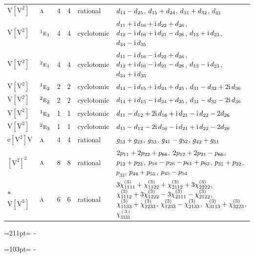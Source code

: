 \documentclass[10pt,a4paper]{article}
\newcommand{\needspace}[1]{\par\penalty-100\begingroup\dimen0=#1\relax\dimen2=\pagegoal
  \advance\dimen2-\pagetotal\ifdim\dimen0>\dimen2\relax\ifdim\dimen2>0pt\vfil\break\fi\fi
  \endgroup}
\numberwithin{equation}{section}
\newcommand{\irr}[1]{\text{\normalfont\scshape #1}}
\newcommand{\conjpair}[1]{{}^{#1}}
\newcommand{\iunit}{\mathrm{i}}
\newcommand{\jahn}[1]{\mathrm{#1}}
\newlength{\fillwidth}\newlength{\cellwidth}\newlength{\colwidth}
\newcommand{\signbreak}{\penalty100\relax}
\begin{document}
{\begin{longtable}{@{}llrrl>{\RaggedRight\arraybackslash}p{\fillwidth}@{}}
$\jahn{V[V^{2}]}$ & $\irr{a}$ & 4 & 4 & rational & $d_{14} -\signbreak d_{25}$, $d_{15} +\signbreak d_{24}$, $d_{31} +\signbreak d_{32}$, $d_{33}$\\
$\jahn{V[V^{2}]}$ & $\conjpair{1}\irr{e}_{1}$ & 4 & 4 & cyclotomic & $d_{11} +\signbreak \iunit{}\,d_{16} +\signbreak \iunit{}\,d_{22} +\signbreak d_{26}$, $d_{12} -\signbreak \iunit{}\,d_{16} +\signbreak \iunit{}\,d_{21} -\signbreak d_{26}$, $d_{13} +\signbreak \iunit{}\,d_{23}$, $d_{34} -\signbreak \iunit{}\,d_{35}$\\
$\jahn{V[V^{2}]}$ & $\conjpair{2}\irr{e}_{1}$ & 4 & 4 & cyclotomic & $d_{11} -\signbreak \iunit{}\,d_{16} -\signbreak \iunit{}\,d_{22} +\signbreak d_{26}$, $d_{12} +\signbreak \iunit{}\,d_{16} -\signbreak \iunit{}\,d_{21} -\signbreak d_{26}$, $d_{13} -\signbreak \iunit{}\,d_{23}$, $d_{34} +\signbreak \iunit{}\,d_{35}$\\
$\jahn{V[V^{2}]}$ & $\conjpair{1}\irr{e}_{2}$ & 2 & 2 & cyclotomic & $d_{14} -\signbreak \iunit{}\,d_{15} +\signbreak \iunit{}\,d_{24} +\signbreak d_{25}$, $d_{31} -\signbreak d_{32} +\signbreak 2\iunit{}\,d_{36}$\\
$\jahn{V[V^{2}]}$ & $\conjpair{2}\irr{e}_{2}$ & 2 & 2 & cyclotomic & $d_{14} +\signbreak \iunit{}\,d_{15} -\signbreak \iunit{}\,d_{24} +\signbreak d_{25}$, $d_{31} -\signbreak d_{32} -\signbreak 2\iunit{}\,d_{36}$\\
$\jahn{V[V^{2}]}$ & $\conjpair{1}\irr{e}_{3}$ & 1 & 1 & cyclotomic & $d_{11} -\signbreak d_{12} +\signbreak 2\iunit{}\,d_{16} +\signbreak \iunit{}\,d_{21} -\signbreak \iunit{}\,d_{22} -\signbreak 2d_{26}$\\
$\jahn{V[V^{2}]}$ & $\conjpair{2}\irr{e}_{3}$ & 1 & 1 & cyclotomic & $d_{11} -\signbreak d_{12} -\signbreak 2\iunit{}\,d_{16} -\signbreak \iunit{}\,d_{21} +\signbreak \iunit{}\,d_{22} -\signbreak 2d_{26}$\\
$\jahn{e[V^{2}]V}$ & $\irr{a}$ & 4 & 4 & rational & $\mathnormal{g}_{13} +\signbreak \mathnormal{g}_{23}$, $\mathnormal{g}_{33}$, $\mathnormal{g}_{41} -\signbreak \mathnormal{g}_{52}$, $\mathnormal{g}_{42} +\signbreak \mathnormal{g}_{51}$\\
$\jahn{[V^{2}]^{2}}$ & $\irr{a}$ & 8 & 8 & rational & $2p_{11} +\signbreak 2p_{22} +\signbreak p_{66}$, $2p_{12} +\signbreak 2p_{21} -\signbreak p_{66}$, $p_{13} +\signbreak p_{23}$, $p_{16} -\signbreak p_{26} -\signbreak p_{61} +\signbreak p_{62}$, $p_{31} +\signbreak p_{32}$, $p_{33}$, $p_{44} +\signbreak p_{55}$, $p_{45} -\signbreak p_{54}$\\*
$\jahn{V[V^{3}]}$ & $\irr{a}$ & 6 & 6 & rational & $3\chi^{(3)}_{1111} +\signbreak \chi^{(3)}_{1122} +\signbreak \chi^{(3)}_{2112} +\signbreak 3\chi^{(3)}_{2222}$, $\chi^{(3)}_{1112} +\signbreak 3\chi^{(3)}_{1222} -\signbreak 3\chi^{(3)}_{2111} -\signbreak \chi^{(3)}_{2122}$, $\chi^{(3)}_{1133} +\signbreak \chi^{(3)}_{2233}$, $\chi^{(3)}_{1233} -\signbreak \chi^{(3)}_{2133}$, $\chi^{(3)}_{3113} +\signbreak \chi^{(3)}_{3223}$, $\chi^{(3)}_{3333}$\\
\bottomrule\end{longtable}}
\needspace{211pt}
\needspace{103pt}
\end{document}
